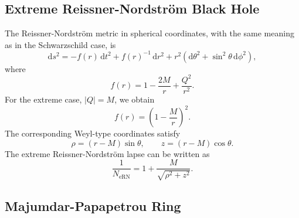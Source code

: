 \subsection{Extreme Reissner-Nordstr\"om Black Hole}
\label{subsec:extreme-rn}

The Reissner-Nordstr\"om metric in spherical coordinates, with the same meaning as in the Schwarzschild case, is
\begin{equation}
    \mathrm{d}s^2
    =
    -f(r)\,\mathrm{d}t^2
    +
    f(r)^{-1}\,\mathrm{d}r^2
    +
    r^2
    \left(
        \mathrm{d}\theta^2
        +
        \sin^2\theta\,\mathrm{d}\phi^2
    \right),
    \label{eq:rn-metric}
\end{equation}
where
\begin{equation}
    f(r)
    =
    1-\frac{2M}{r}+\frac{Q^2}{r^2}.
    \label{eq:rn-function}
\end{equation}
For the extreme case, \(|Q|=M\), we obtain
\begin{equation}
    f(r)
    =
    \left(1-\frac{M}{r}\right)^2.
\end{equation}
The corresponding Weyl-type coordinates satisfy
\begin{equation}
    \rho=(r-M)\sin\theta,
    \qquad
    z=(r-M)\cos\theta.
    \label{eq:ern-weyl-coordinates}
\end{equation}
The extreme
Reissner-Nordstr\"om lapse can be written as
\begin{equation}
    \frac{1}{N_{\mathrm{eRN}}}
    =
    1+\frac{M}{\sqrt{\rho^2+z^2}}.
    \label{eq:ern-lapse}
\end{equation}
\cite{Semerak2016, Kraus2025, BicakSemerak2026}

\subsection{Majumdar-Papapetrou Ring}
\label{subsec:mp-ring}

